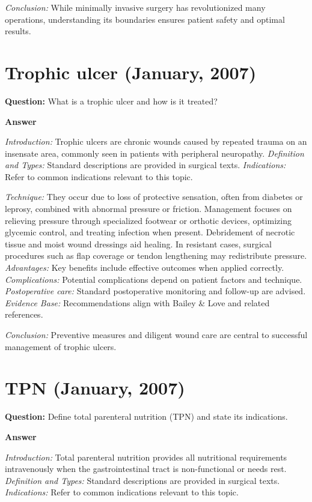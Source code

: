 \documentclass{article}
\begin{document}
\emph{Conclusion:} While minimally invasive surgery has revolutionized many operations, understanding its boundaries ensures patient safety and optimal results.


\section{Trophic ulcer (January, 2007)}

\textbf{Question:} What is a trophic ulcer and how is it treated?

\textbf{Answer}

\emph{Introduction:} Trophic ulcers are chronic wounds caused by repeated trauma on an insensate area, commonly seen in patients with peripheral neuropathy.
\emph{Definition and Types:} Standard descriptions are provided in surgical texts.
\emph{Indications:} Refer to common indications relevant to this topic.

\emph{Technique:} They occur due to loss of protective sensation, often from diabetes or leprosy, combined with abnormal pressure or friction. Management focuses on relieving pressure through specialized footwear or orthotic devices, optimizing glycemic control, and treating infection when present. Debridement of necrotic tissue and moist wound dressings aid healing. In resistant cases, surgical procedures such as flap coverage or tendon lengthening may redistribute pressure.
\emph{Advantages:} Key benefits include effective outcomes when applied correctly.
\emph{Complications:} Potential complications depend on patient factors and technique.
\emph{Postoperative care:} Standard postoperative monitoring and follow-up are advised.
\emph{Evidence Base:} Recommendations align with Bailey & Love and related references.

\emph{Conclusion:} Preventive measures and diligent wound care are central to successful management of trophic ulcers.


\section{TPN (January, 2007)}

\textbf{Question:} Define total parenteral nutrition (TPN) and state its indications.

\textbf{Answer}

\emph{Introduction:} Total parenteral nutrition provides all nutritional requirements intravenously when the gastrointestinal tract is non-functional or needs rest.
\emph{Definition and Types:} Standard descriptions are provided in surgical texts.
\emph{Indications:} Refer to common indications relevant to this topic.
\end{document}
